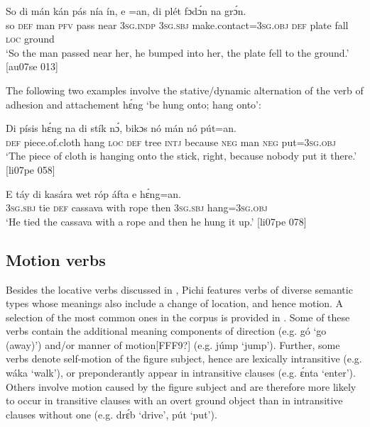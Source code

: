 \ea%
    \label{ex:key:949}
    \gll So  di  mán  kán  pás  nía  ín,    e    =an, 
di  plét    fɔdɔ́n  na  grɔ́n.\\
so  \textsc{def}  man  \textsc{pfv}  pass  near  \textsc{3sg.indp}  \textsc{3sg.sbj}  make.contact=\textsc{3sg.obj} 
\textsc{def}  plate  fall    \textsc{loc}  ground\\

\glt ‘So the man passed near her, he bumped into her, the plate fell 
to the ground.’ [au07se 013]
\z

The following two examples involve the stative/dynamic alternation of the verb of adhesion and attachement hɛ́ng ‘be hung onto; hang onto’:


\ea%
    \label{ex:key:950}
    \gll Di  písis        hɛ́ng  na  di  stík  nɔ́,
bikɔs  nó  mán    nó  pút=an.\\
\textsc{def}  piece.of.cloth    hang  \textsc{loc}  \textsc{def}  tree  \textsc{intj}
because  \textsc{neg}  man    \textsc{neg}  put=\textsc{3sg.obj}\\

\glt ‘The piece of cloth is hanging onto the stick, right, because 
nobody put it there.’ [li07pe 058]
\z


\ea%
    \label{ex:key:951}
    \gll E    táy  di  kasára  wet  róp    áfta    e    hɛ́ng=an.\\
\textsc{3sg.sbj}  tie  \textsc{def}  cassava  with  rope  then  \textsc{3sg.sbj}  hang=\textsc{3sg.obj}\\

\glt ‘He tied the cassava with a rope and then he hung it up.’ [li07pe 078]
\z

\subsection{Motion verbs}\label{sec:8.1.4}

Besides the locative verbs discussed in , Pichi features verbs of diverse semantic types whose meanings also include a change of location, and hence motion. A selection of the most common ones in the corpus is provided in . Some of these verbs contain the additional meaning components of direction (e.g. gó ‘go (away)’) and/or manner of motion[FFF9?] (e.g. júmp ‘jump’). Further, some verbs denote self-motion of the figure subject, hence are lexically intransitive (e.g. wáka ‘walk’), or preponderantly appear in intransitive clauses (e.g. ɛ́nta ‘enter’). Others involve motion caused by the figure subject and are therefore more likely to occur in transitive clauses with an overt ground object than in intransitive clauses without one (e.g. drɛ́b ‘drive’, pút ‘put’).


